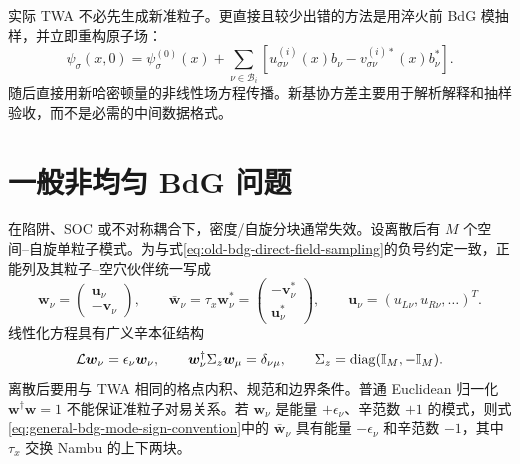实际 TWA 不必先生成新准粒子。更直接且较少出错的方法是用淬火前 BdG 模抽样，并立即重构原子场：
\begin{equation}
  \psi_\sigma(x,0)=\psi_\sigma^{(0)}(x)
  +\sum_{\nu\in\mathcal B_i}
  \left[u^{(i)}_{\sigma\nu}(x)b_\nu
  -v^{(i)*}_{\sigma\nu}(x)b_\nu^*\right].
  \label{eq:old-bdg-direct-field-sampling}
\end{equation}
随后直接用新哈密顿量的非线性场方程传播。新基协方差主要用于解析解释和抽样验收，而不是必需的中间数据格式。

\section{一般非均匀 BdG 问题}

在陷阱、SOC 或不对称耦合下，密度/自旋分块通常失效。设离散后有 $M$ 个空间--自旋单粒子模式。为与式\eqref{eq:old-bdg-direct-field-sampling}的负号约定一致，正能列及其粒子--空穴伙伴统一写成
\begin{equation}
  \bm w_\nu=\begin{pmatrix}\bm u_\nu\\-\bm v_\nu\end{pmatrix},
  \qquad
  \bar{\bm w}_\nu=\tau_x\bm w_\nu^*
  =\begin{pmatrix}-\bm v_\nu^*\\\bm u_\nu^*\end{pmatrix},
  \qquad
  \bm u_\nu=(u_{L\nu},u_{R\nu},\ldots)^T.
  \label{eq:general-bdg-mode-sign-convention}
\end{equation}
线性化方程具有广义辛本征结构
\begin{equation}
  \mathcal L\bm w_\nu=\epsilon_\nu\bm w_\nu,
  \qquad
  \bm w_\nu^\dagger\Sigma_z\bm w_\mu=\delta_{\nu\mu},
  \qquad
  \Sigma_z=\operatorname{diag}(\mathbb{I}_M,-\mathbb{I}_M).
  \label{eq:spinor-bdg-symplectic-norm}
\end{equation}
离散后要用与 TWA 相同的格点内积、规范和边界条件。普通 Euclidean 归一化 $\bm w^\dagger\bm w=1$ 不能保证准粒子对易关系。若 $\bm w_\nu$ 是能量 $+\epsilon_\nu$、辛范数 $+1$ 的模式，则式\eqref{eq:general-bdg-mode-sign-convention}中的 $\bar{\bm w}_\nu$ 具有能量 $-\epsilon_\nu$ 和辛范数 $-1$，其中 $\tau_x$ 交换 Nambu 的上下两块。

